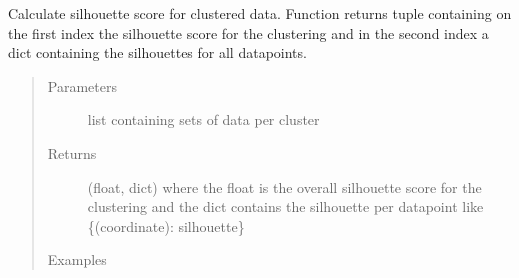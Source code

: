 \documentclass[letterpaper,10pt,english]{sphinxmanual}
\begin{document}
\begin{fulllineitems}
\label{\detokenize{clustering:clustering.silhouetteScore}}
\sphinxAtStartPar
Calculate silhouette score for clustered data.     Function returns tuple containing on the first index     the silhouette score for the clustering and in the     second index a dict containing the silhouettes for all     datapoints.
\begin{quote}\begin{description}
\item[{Parameters}] \leavevmode
\sphinxAtStartPar
{} \textendash{} list containing sets of data per cluster

\item[{Returns}] \leavevmode
\sphinxAtStartPar
(float, dict) where the float is the overall silhouette score for the clustering and the dict contains the silhouette per datapoint like \{(coordinate): silhouette\}

\item[{Examples}] \leavevmode
\end{description}\end{quote}

\begin{sphinxVerbatim}[commandchars=\\\{\}]
  \PYG{p}{[}                   \PYG{p}{]}
\end{sphinxVerbatim}


\end{fulllineitems}
\end{document}
